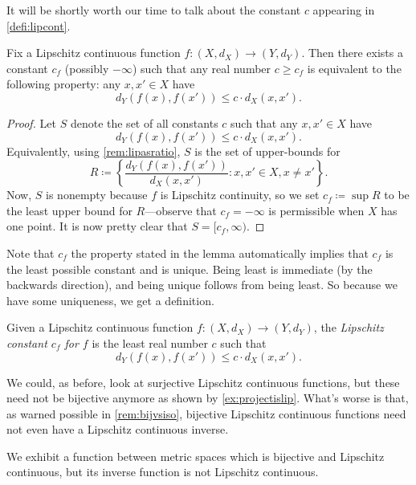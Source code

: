 \documentclass[../notes.tex]{subfiles}
\begin{document}
It will be shortly worth our time to talk about the constant $c$ appearing in \autoref{defi:lipcont}.
\begin{lemma} \label{lem:getlipconst}
	Fix a Lipschitz continuous function $f\colon(X,d_X)\to(Y,d_Y)$. Then there exists a constant $c_f$ (possibly $-\infty$) such that any real number $c\ge c_f$ is equivalent to the following property: any $x,x'\in X$ have
	\[d_Y(f(x),f(x'))\le c\cdot d_X(x,x').\]
\end{lemma}
\begin{proof}
	Let $S$ denote the set of all constants $c$ such that any $x,x'\in X$ have
	\[d_Y(f(x),f(x'))\le c\cdot d_X(x,x').\]
	Equivalently, using \autoref{rem:lipasratio}, $S$ is the set of upper-bounds for
	\[R\coloneqq\left\{\frac{d_Y(f(x),f(x'))}{d_X(x,x')}:x,x'\in X,x\ne x'\right\}.\]
	Now, $S$ is nonempty because $f$ is Lipschitz continuity, so we set $c_f\coloneqq\sup R$ to be the least upper bound for $R$---observe that $c_f=-\infty$ is permissible when $X$ has one point. It is now pretty clear that $S=[c_f,\infty)$.
\end{proof}
Note that $c_f$ the property stated in the lemma automatically implies that $c_f$ is the least possible constant and is unique. Being least is immediate (by the backwards direction), and being unique follows from being least. So because we have some uniqueness, we get a definition.
\begin{definition}
	Given a Lipschitz continuous function $f\colon(X,d_X)\to(Y,d_Y)$, the \textit{Lipschitz constant $c_f$ for $f$} is the least real number $c$ such that
	\[d_Y(f(x),f(x'))\le c\cdot d_X(x,x').\]
\end{definition}
We could, as before, look at surjective Lipschitz continuous functions, but these need not be bijective anymore as shown by \autoref{ex:projectislip}. What's worse is that, as warned possible in \autoref{rem:bijvsiso}, bijective Lipschitz continuous functions need not even have a Lipschitz continuous inverse.
\begin{exe} \label{exe:sadbijlip}
	We exhibit a function between metric spaces which is bijective and Lipschitz continuous, but its inverse function is not Lipschitz continuous.
\end{exe}
\end{document}
